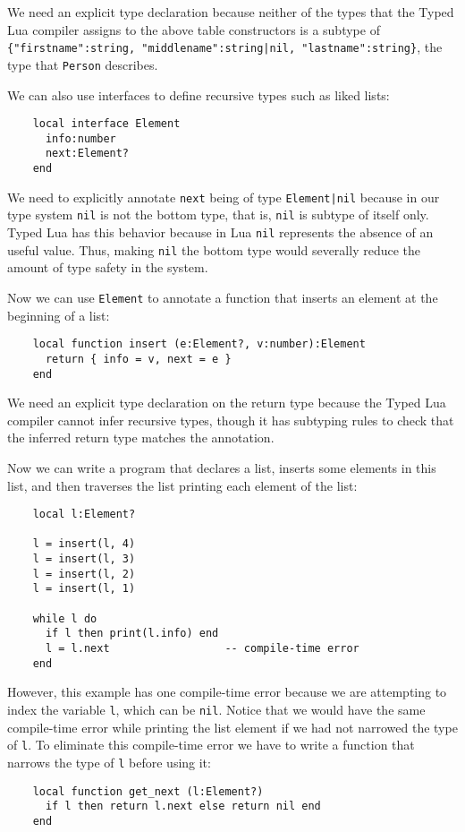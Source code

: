 We need an explicit type declaration because neither of the types
that the Typed Lua compiler assigns to the above table constructors
is a subtype of
\texttt{\{"firstname":string, "middlename":string|nil, "lastname":string\}},
the type that \texttt{Person} describes.

We can also use interfaces to define recursive types such as liked lists:

\begin{verbatim}
    local interface Element
      info:number
      next:Element?
    end
\end{verbatim}

We need to explicitly annotate \texttt{next} being of type
\texttt{Element|nil} because in our type system \texttt{nil}
is not the bottom type, that is, \texttt{nil} is subtype of itself only.
Typed Lua has this behavior because in Lua \texttt{nil} represents
the absence of an useful value.
Thus, making \texttt{nil} the bottom type would severally reduce the amount
of type safety in the system.

Now we can use \texttt{Element} to annotate a function that
inserts an element at the beginning of a list:
\begin{verbatim}
    local function insert (e:Element?, v:number):Element 
      return { info = v, next = e }
    end
\end{verbatim}

We need an explicit type declaration on the return type because
the Typed Lua compiler cannot infer recursive types, though
it has subtyping rules to check that the inferred return type
matches the annotation.

Now we can write a program that declares a list, inserts some
elements in this list, and then traverses the list printing
each element of the list:
\begin{verbatim}
    local l:Element?

    l = insert(l, 4)
    l = insert(l, 3)
    l = insert(l, 2)
    l = insert(l, 1)

    while l do
      if l then print(l.info) end
      l = l.next                  -- compile-time error
    end
\end{verbatim}

However, this example has one compile-time error because we
are attempting to index the variable \texttt{l},
which can be \texttt{nil}.
Notice that we would have the same compile-time error while
printing the list element if we had not narrowed the type of
\texttt{l}.
To eliminate this compile-time error we have to write a
function that narrows the type of \texttt{l} before using it:
\begin{verbatim}
    local function get_next (l:Element?)
      if l then return l.next else return nil end
    end
\end{verbatim}

